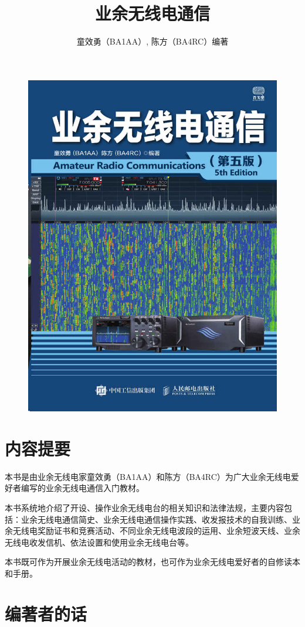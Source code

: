 \documentclass[12pt,UTF8]{ctexbook}
\title{\heiti\zihao{0} 业余无线电通信}
\author{童效勇（BA1AA）, 陈方（BA4RC）编著}
\date{}
\begin{document}
\maketitle
\tableofcontents

\frontmatter

\begin{figure}[htbp]
	\centering
	\includegraphics[width=0.7\linewidth]{cover}
	\caption{}
	\label{fig:1}
\end{figure}



\chapter{内容提要}

本书是由业余无线电家童效勇（BA1AA）和陈方（BA4RC）为广大业余无线电爱好者编写的业余无线电通信入门教材。

本书系统地介绍了开设、操作业余无线电台的相关知识和法律法规，主要内容包括：业余无线电通信简史、业余无线电通信操作实践、收发报技术的自我训练、业余无线电奖励证书和竞赛活动、不同业余无线电波段的运用、业余短波天线、业余无线电收发信机、依法设置和使用业余无线电台等。

本书既可作为开展业余无线电活动的教材，也可作为业余无线电爱好者的自修读本和手册。




\chapter{编著者的话}
\end{document}
